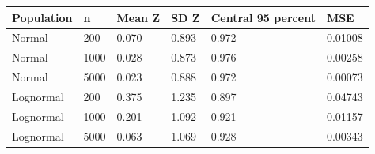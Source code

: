 \begin{tabular}{llllll}
\toprule
Population & n & Mean Z & SD Z & Central 95 percent & MSE \\
\midrule
Normal & 200 & 0.070 & 0.893 & 0.972 & 0.01008 \\
Normal & 1000 & 0.028 & 0.873 & 0.976 & 0.00258 \\
Normal & 5000 & 0.023 & 0.888 & 0.972 & 0.00073 \\
Lognormal & 200 & 0.375 & 1.235 & 0.897 & 0.04743 \\
Lognormal & 1000 & 0.201 & 1.092 & 0.921 & 0.01157 \\
Lognormal & 5000 & 0.063 & 1.069 & 0.928 & 0.00343 \\
\bottomrule
\end{tabular}
